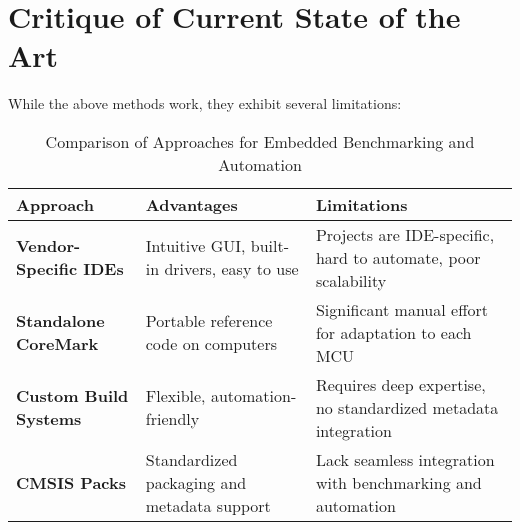 \section{Critique of Current State of the Art}

While the above methods work, they exhibit several limitations:


\begin{table}[htbp]
    \centering
    \caption{Comparison of Approaches for Embedded Benchmarking and Automation}
    \label{tab:benchmarking_approaches}
    \begin{tabularx}{\linewidth}{@{}>{\bfseries}l X X@{}}
        \toprule
        Approach & Advantages & Limitations \\
        \midrule
        Vendor-Specific IDEs & Intuitive GUI, built-in drivers, easy to use & Projects are IDE-specific, hard to automate, poor scalability \\
        \midrule
        Standalone CoreMark & Portable reference code on computers & Significant manual effort for adaptation to each MCU \\
        \midrule
        Custom Build Systems & Flexible, automation-friendly & Requires deep expertise, no standardized metadata integration \\
        \midrule
        CMSIS Packs & Standardized packaging and metadata support & Lack seamless integration with benchmarking and automation \\
        \bottomrule
    \end{tabularx}
\end{table}


